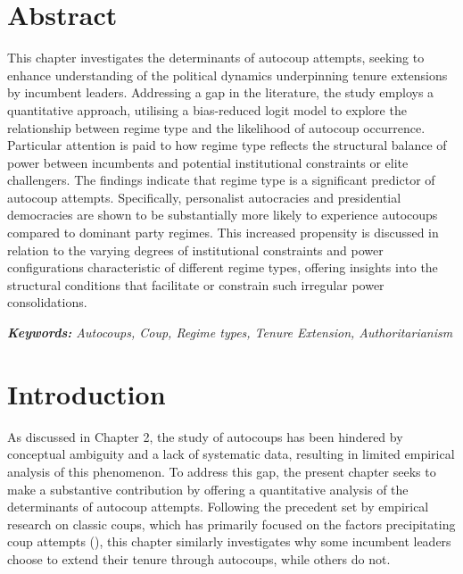 \documentclass[
  12pt,
]{report}
\begin{document}
\section*{Abstract}\label{abstract-2}

This chapter investigates the determinants of autocoup attempts, seeking
to enhance understanding of the political dynamics underpinning tenure
extensions by incumbent leaders. Addressing a gap in the literature, the
study employs a quantitative approach, utilising a bias-reduced logit
model to explore the relationship between regime type and the likelihood
of autocoup occurrence. Particular attention is paid to how regime type
reflects the structural balance of power between incumbents and
potential institutional constraints or elite challengers. The findings
indicate that regime type is a significant predictor of autocoup
attempts. Specifically, personalist autocracies and presidential
democracies are shown to be substantially more likely to experience
autocoups compared to dominant party regimes. This increased propensity
is discussed in relation to the varying degrees of institutional
constraints and power configurations characteristic of different regime
types, offering insights into the structural conditions that facilitate
or constrain such irregular power consolidations.

\emph{\textbf{Keywords:} Autocoups, Coup, Regime types, Tenure
Extension, Authoritarianism}

\newpage

\section{Introduction}\label{introduction-2}

As discussed in Chapter 2, the study of autocoups has been hindered by
conceptual ambiguity and a lack of systematic data, resulting in limited
empirical analysis of this phenomenon. To address this gap, the present
chapter seeks to make a substantive contribution by offering a
quantitative analysis of the determinants of autocoup attempts.
Following the precedent set by empirical research on classic coups,
which has primarily focused on the factors precipitating coup attempts
(), this
chapter similarly investigates why some incumbent leaders choose to
extend their tenure through autocoups, while others do not.
\end{document}
